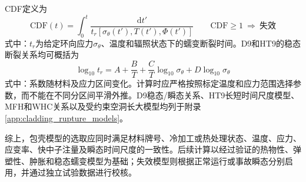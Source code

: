 CDF定义为
\begin{equation}
	\mathrm{CDF}(t)
	=\int_0^t
	\frac{\mathrm dt'}
	{t_r[\sigma_\theta(t'),T(t'),\Phi(t')]}
	\qquad
	\mathrm{CDF}\geq1\ \Longrightarrow\ \text{失效}
	\label{eq:clad_cumulative_damage_fraction}
\end{equation}
式中：$t_r$为给定环向应力$\sigma_\theta$、温度和辐照状态下的蠕变断裂时间。D9和HT9的稳态断裂关系均可概括为
\begin{equation}
	\log_{10}t_r
	=A+\frac{B}{T}
	+\frac{C}{T}\log_{10}\sigma_\theta
	+D\log_{10}\sigma_\theta
	\label{eq:clad_generic_rupture_time}
\end{equation}
式中：系数随材料及应力区间变化。计算时应严格按照标定温度和应力范围选择参数，而不能在不同分区间平滑外推。D9稳态/瞬态关系、HT9长短时间尺度模型、MFH和WHC关系以及受约束空洞长大模型均列于附录\ref{app:cladding_rupture_models}。

综上，包壳模型的选取应同时满足材料牌号、冷加工或热处理状态、温度、应力、应变率、快中子注量及瞬态时间尺度的一致性。后续计算以经过验证的热物性、弹塑性、肿胀和稳态蠕变模型为基础；失效模型则根据正常运行或事故瞬态分别启用，并通过独立试验数据进行校核。


